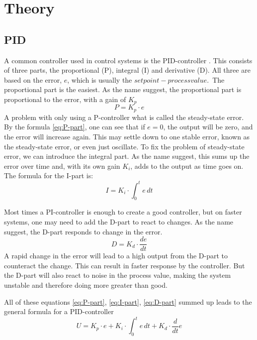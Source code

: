 \section{Theory}

\subsection{PID}
A common controller used in control systems is the PID-controller \cite{wiki-pid}. This consists of three parts, the proportional (P), integral (I) and derivative (D). All three are based on the error, $e$, which is usually the $setpoint - process value$.\
The proportional part is the easiest. As the name suggest, the proportional part is proportional to the error, with a gain of $K_p$
\begin{equation}
    \label{eq:P-part}
    P = K_p \cdot e
\end{equation}
A problem with only using a P-controller what is called the steady-state error. By the formula \ref{eq:P-part}, one can see that if $e = 0$, the output will be zero, and the error will increase again. This may settle down to one stable error, known as the steady-state error, or even just oscillate.
To fix the problem of steady-state error, we can introduce the integral part. As the name suggest, this sums up the error over time and, with its own gain $K_i$, adds to the output as time goes on. The formula for the I-part is:
\begin{equation}
    \label{eq:I-part}
    I = K_i \cdot \int_{0}^{t} e\,dt
\end{equation}

Most times a PI-controller is enough to create a good controller, but on faster systems, one may need to add the D-part to react to changes. As the name suggest, the D-part responds to change in the error. 
\begin{equation}
    \label{eq:D-part}
    D = K_d \cdot \frac{de}{dt}
\end{equation}
A rapid change in the error will lead to a high output from the D-part to counteract the change. This can result in faster response by the controller. But the D-part will also react to noise in the process value, making the system unstable and therefore doing more greater than good.

All of these equations \ref{eq:P-part}, \ref{eq:I-part}, \ref{eq:D-part} summed up leads to the general formula for a PID-controller
\begin{equation}
    \label{eq:PID}
    U = K_p \cdot e + K_i \cdot \int_{0}^{t} e\,dt + K_d \cdot \frac{d}{dt} e
\end{equation}


